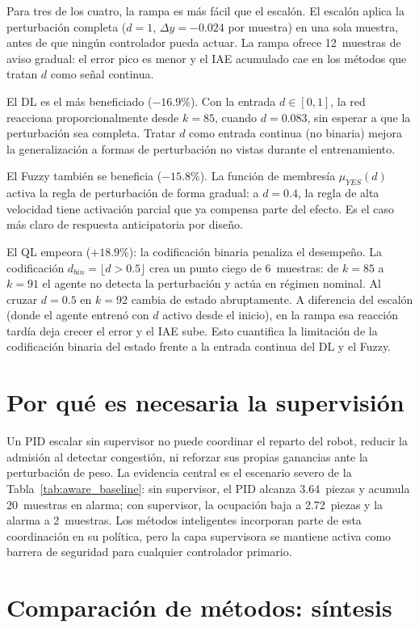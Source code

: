 Para tres de los cuatro, la rampa es más fácil que el escalón. El escalón aplica la perturbación completa ($d=1$, $\Delta y=-0.024$ por muestra) en una sola muestra, antes de que ningún controlador pueda actuar. La rampa ofrece 12~muestras de aviso gradual: el error pico es menor y el IAE acumulado cae en los métodos que tratan $d$ como señal continua.

El DL es el más beneficiado ($-16.9\%$). Con la entrada $d\in[0,1]$, la red reacciona proporcionalmente desde $k=85$, cuando $d=0.083$, sin esperar a que la perturbación sea completa. Tratar $d$ como entrada continua (no binaria) mejora la generalización a formas de perturbación no vistas durante el entrenamiento.

El Fuzzy también se beneficia ($-15.8\%$). La función de membresía $\mu_{YES}(d)$ activa la regla de perturbación de forma gradual: a $d=0.4$, la regla de alta velocidad tiene activación parcial que ya compensa parte del efecto. Es el caso más claro de respuesta anticipatoria por diseño.

El QL empeora ($+18.9\%$): la codificación binaria penaliza el desempeño. La codificación $d_{bin}=\lfloor d>0.5\rfloor$ crea un punto ciego de 6~muestras: de $k=85$ a $k=91$ el agente no detecta la perturbación y actúa en régimen nominal. Al cruzar $d=0.5$ en $k=92$ cambia de estado abruptamente. A diferencia del escalón (donde el agente entrenó con $d$ activo desde el inicio), en la rampa esa reacción tardía deja crecer el error y el IAE sube. Esto cuantifica la limitación de la codificación binaria del estado frente a la entrada continua del DL y el Fuzzy.

\section{Por qué es necesaria la supervisión}

Un PID escalar sin supervisor no puede coordinar el reparto del robot, reducir la admisión al detectar congestión, ni reforzar sus propias ganancias ante la perturbación de peso. La evidencia central es el escenario severo de la Tabla~\ref{tab:aware_baseline}: sin supervisor, el PID alcanza 3.64~piezas y acumula 20~muestras en alarma; con supervisor, la ocupación baja a 2.72~piezas y la alarma a 2~muestras. Los métodos inteligentes incorporan parte de esta coordinación en su política, pero la capa supervisora se mantiene activa como barrera de seguridad para cualquier controlador primario.

\section{Comparación de métodos: síntesis}

